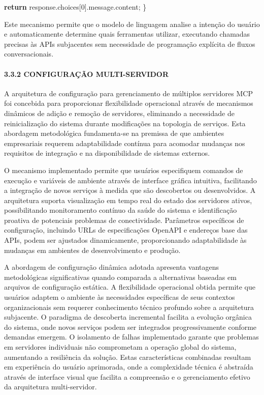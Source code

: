 \documentclass[
]{article}
\newenvironment{Shaded}{}{}
\newcommand{\AttributeTok}[1]{\textcolor[rgb]{0.49,0.56,0.16}{#1}}
\newcommand{\ControlFlowTok}[1]{\textcolor[rgb]{0.00,0.44,0.13}{\textbf{#1}}}
\newcommand{\DecValTok}[1]{\textcolor[rgb]{0.25,0.63,0.44}{#1}}
\newcommand{\NormalTok}[1]{#1}
\newcommand{\OperatorTok}[1]{\textcolor[rgb]{0.40,0.40,0.40}{#1}}
\begin{document}
\begin{Shaded}
\begin{Highlighting}[]
  \ControlFlowTok{return}\NormalTok{ response}\OperatorTok{.}\AttributeTok{choices}\NormalTok{[}\DecValTok{0}\NormalTok{]}\OperatorTok{.}\AttributeTok{message}\OperatorTok{.}\AttributeTok{content}\OperatorTok{;}
\NormalTok{\}}
\end{Highlighting}
\end{Shaded}

Este mecanismo permite que o modelo de linguagem analise a intenção do
usuário e automaticamente determine quais ferramentas utilizar,
executando chamadas precisas às APIs subjacentes sem necessidade de
programação explícita de fluxos conversacionais.

\paragraph{3.3.2 CONFIGURAÇÃO
MULTI-SERVIDOR}\label{configurauxe7uxe3o-multi-servidor}

A arquitetura de configuração para gerenciamento de múltiplos servidores
MCP foi concebida para proporcionar flexibilidade operacional através de
mecanismos dinâmicos de adição e remoção de servidores, eliminando a
necessidade de reinicialização do sistema durante modificações na
topologia de serviços. Esta abordagem metodológica fundamenta-se na
premissa de que ambientes empresariais requerem adaptabilidade contínua
para acomodar mudanças nos requisitos de integração e na disponibilidade
de sistemas externos.

O mecanismo implementado permite que usuários especifiquem comandos de
execução e variáveis de ambiente através de interface gráfica intuitiva,
facilitando a integração de novos serviços à medida que são descobertos
ou desenvolvidos. A arquitetura suporta visualização em tempo real do
estado dos servidores ativos, possibilitando monitoramento contínuo da
saúde do sistema e identificação proativa de potenciais problemas de
conectividade. Parâmetros específicos de configuração, incluindo URLs de
especificações OpenAPI e endereços base das APIs, podem ser ajustados
dinamicamente, proporcionando adaptabilidade às mudanças em ambientes de
desenvolvimento e produção.

A abordagem de configuração dinâmica adotada apresenta vantagens
metodológicas significativas quando comparada a alternativas baseadas em
arquivos de configuração estática. A flexibilidade operacional obtida
permite que usuários adaptem o ambiente às necessidades específicas de
seus contextos organizacionais sem requerer conhecimento técnico
profundo sobre a arquitetura subjacente. O paradigma de descoberta
incremental facilita a evolução orgânica do sistema, onde novos serviços
podem ser integrados progressivamente conforme demandas emergem. O
isolamento de falhas implementado garante que problemas em servidores
individuais não comprometam a operação global do sistema, aumentando a
resiliência da solução. Estas características combinadas resultam em
experiência do usuário aprimorada, onde a complexidade técnica é
abstraída através de interface visual que facilita a compreensão e o
gerenciamento efetivo da arquitetura multi-servidor.
\end{document}

